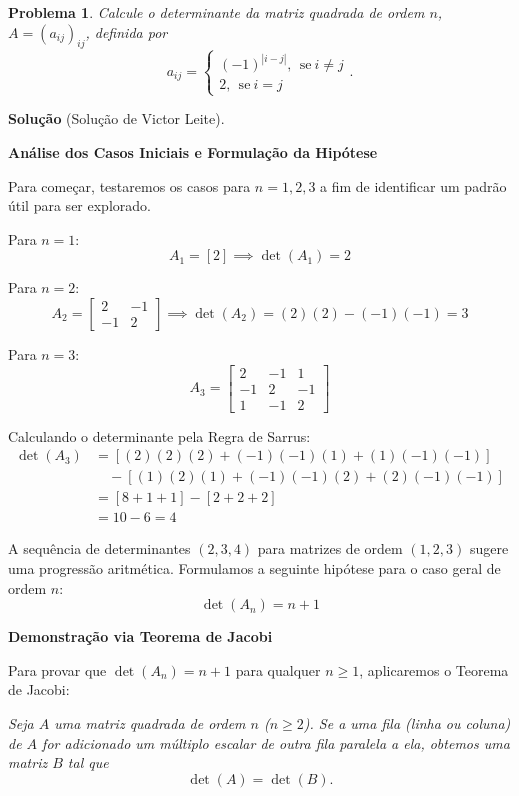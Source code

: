 \documentclass{hipatia}
\newtheorem{problem*}{Problema}
\begin{document}
\begin{problem*} 
Calcule o determinante da matriz quadrada de ordem $n$, $A = (a_{ij})_{ij}$, definida por $$a_{ij} = \begin{cases}
    (-1)^{|i-j|}, \ \ \mbox{se} \ i \neq j \\ 2, \ \ \mbox{se} \ i=j
\end{cases}.$$
\end{problem*}


\noindent \textbf{Solução} (Solução de Victor Leite). 

\textbf{Análise dos Casos Iniciais e Formulação da Hipótese}

Para começar, testaremos os casos para $n=1, 2, 3$ a fim de identificar um padrão útil para ser explorado.

Para $n=1$:
$$A_1 = [2] \implies \det(A_1) = 2$$

Para $n=2$:
$$A_2 = \begin{bmatrix} 2 & -1 \\ -1 & 2 \end{bmatrix} \implies \det(A_2) = (2)(2) - (-1)(-1) = 3$$

Para $n=3$:
$$A_3 = \begin{bmatrix} 2 & -1 & 1 \\ -1 & 2 & -1 \\ 1 & -1 & 2 \end{bmatrix}$$

Calculando o determinante pela Regra de Sarrus:
\begin{align*}
\det(A_3) &= [(2)(2)(2) + (-1)(-1)(1) + (1)(-1)(-1)] \\
          &\quad - [(1)(2)(1) + (-1)(-1)(2) + (2)(-1)(-1)] \\
          &= [8 + 1 + 1] - [2 + 2 + 2] \\
          &= 10 - 6 = 4
\end{align*}

A sequência de determinantes $(2, 3, 4)$ para matrizes de ordem $(1, 2, 3)$ sugere uma progressão aritmética. Formulamos a seguinte hipótese para o caso geral de ordem $n$:
$$\det(A_n) = n+1$$

\vspace{0.5cm}
\textbf{Demonstração via Teorema de Jacobi}

Para provar que $\det(A_n) = n+1$ para qualquer $n \ge 1$, aplicaremos o Teorema de Jacobi:

\emph{Seja $A$ uma matriz quadrada de ordem $n$ ($n \ge 2$). Se a uma fila (linha ou coluna) de $A$ for adicionado um múltiplo escalar de outra fila paralela a ela, obtemos uma matriz $B$ tal que}
$$\det(A) = \det(B).$$
\end{document}
